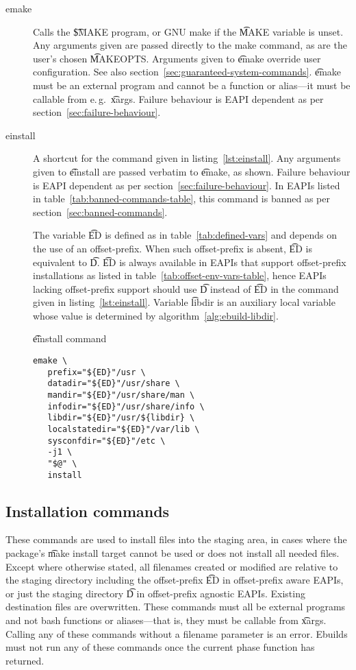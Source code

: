 \begin{description}
\item[emake] Calls the \t{\$MAKE} program, or GNU make if the \t{MAKE} variable is unset.
    Any arguments given are passed directly to the make command, as are the user's chosen
    \t{MAKEOPTS}\@. Arguments given to \t{emake} override user configuration. See also
    section~\ref{sec:guaranteed-system-commands}. \t{emake} must be an external program and cannot
    be a function or alias---it must be callable from e.\,g.\ \t{xargs}. Failure behaviour is EAPI
    dependent as per section~\ref{sec:failure-behaviour}.

\item[einstall] A shortcut for the command given in listing~\ref{lst:einstall}. Any arguments given
    to \t{einstall} are passed verbatim to \t{emake}, as shown. Failure behaviour is EAPI dependent
    as per section~\ref{sec:failure-behaviour}.
    In EAPIs listed in table~\ref{tab:banned-commands-table}, this command is banned as per
    section~\ref{sec:banned-commands}.

    The variable \t{ED} is defined as in table~\ref{tab:defined-vars} and depends on the use of an
    offset-prefix. When such offset-prefix is absent, \t{ED} is equivalent to \t{D}\@. \t{ED} is
    always available in EAPIs that support offset-prefix installations as listed in
    table~\ref{tab:offset-env-vars-table}, hence EAPIs lacking offset-prefix support should use
    \t{D} instead of \t{ED} in the command given in listing~\ref{lst:einstall}.
    Variable \t{libdir} is an auxiliary local variable whose value is determined by
    algorithm~\ref{alg:ebuild-libdir}.

\begin{listing}[H]
\caption{\t{einstall} command} \label{lst:einstall}
\begin{verbatim}
emake \
   prefix="${ED}"/usr \
   datadir="${ED}"/usr/share \
   mandir="${ED}"/usr/share/man \
   infodir="${ED}"/usr/share/info \
   libdir="${ED}"/usr/${libdir} \
   localstatedir="${ED}"/var/lib \
   sysconfdir="${ED}"/etc \
   -j1 \
   "$@" \
   install
\end{verbatim}
\end{listing}

\end{description}

\subsection{Installation commands}
These commands are used to install files into the staging area, in cases where the package's \t{make
install} target cannot be used or does not install all needed files. Except where otherwise stated,
all filenames created or modified are relative to the staging directory including the offset-prefix
\t{ED} in offset-prefix aware EAPIs, or just the staging directory \t{D} in offset-prefix agnostic
EAPIs. Existing destination files are overwritten. These commands must all be external programs and
not bash functions or aliases---that is, they must be callable from \t{xargs}. Calling any of these
commands without a filename parameter is an error. Ebuilds must not run any of these commands once
the current phase function has returned.

